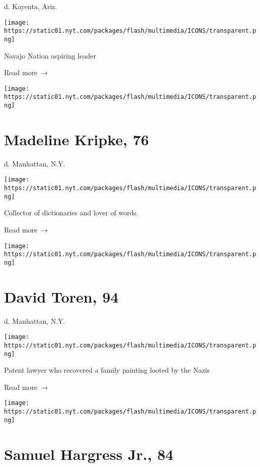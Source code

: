 d. Kayenta, Ariz.

\texttt{[image: https://static01.nyt.com/packages/flash/multimedia/ICONS/transparent.png]}

Navajo Nation aspiring leader

 Read more~→

\href{https://www.nytimes.com/2020/04/30/nyregion/madeline-kripke-dead-coronavirus.html}{}

\texttt{[image: https://static01.nyt.com/packages/flash/multimedia/ICONS/transparent.png]}

\hypertarget{madeline-kripke-76}{%
\section{Madeline Kripke, 76}\label{madeline-kripke-76}}

d. Manhattan, N.Y.

\texttt{[image: https://static01.nyt.com/packages/flash/multimedia/ICONS/transparent.png]}

Collector of dictionaries and lover of words.

 Read more~→

\href{https://www.nytimes.com/2020/04/30/obituaries/david-toren-dead-coronavirus.html}{}

\texttt{[image: https://static01.nyt.com/packages/flash/multimedia/ICONS/transparent.png]}

\hypertarget{david-toren-94}{%
\section{David Toren, 94}\label{david-toren-94}}

d. Manhattan, N.Y.

\texttt{[image: https://static01.nyt.com/packages/flash/multimedia/ICONS/transparent.png]}

Patent lawyer who recovered a family painting looted by the Nazis

 Read more~→

\href{https://www.nytimes.com/2020/04/29/nyregion/samuel-hargress-jr-dead-coronavirus.html}{}

\texttt{[image: https://static01.nyt.com/packages/flash/multimedia/ICONS/transparent.png]}

\hypertarget{samuel-hargress-jr-84}{%
\section{Samuel Hargress Jr., 84}\label{samuel-hargress-jr-84}}

